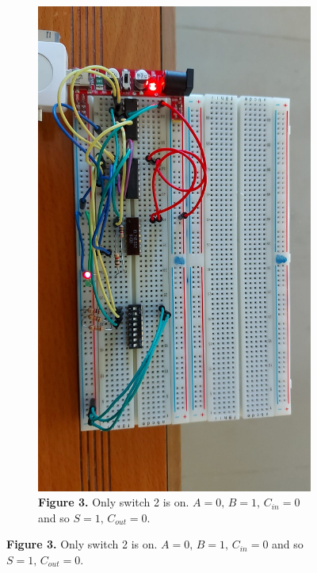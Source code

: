 \documentclass[a4paper]{article}
\begin{document}
\newpage
\begin{figure}
     \centering
     \begin{subfigure}[b]{0.9\textwidth}
         \centering
          \includegraphics[angle=90, width=\textwidth]{2on.jpeg}
         \caption*{\textbf{Figure 3.} Only switch 2 is on. $A=0,\,B=1,\, C_{in} = 0$ and so $S=1,\,C_{out}=0$.\vspace{2em}}
         \label{fig:2on}
     \end{subfigure}
     \hfill

\end{figure}
\end{document}
